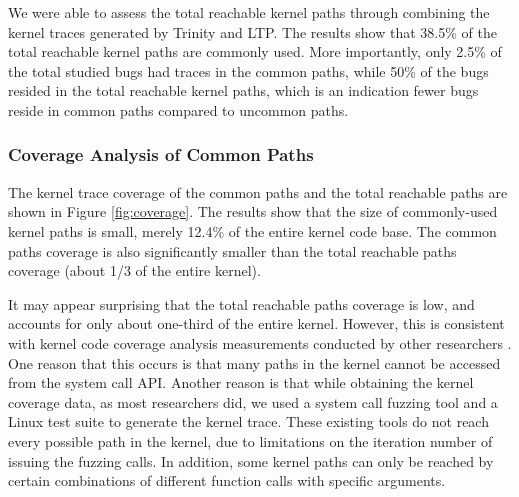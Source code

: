 We were able to assess the total reachable kernel paths through combining the kernel traces generated by Trinity and LTP.
The results show that 38.5\% of the total reachable
kernel paths are commonly used. More importantly, only 2.5\% of the total studied bugs had traces in the common paths,
while 50\% of the bugs resided in the total reachable kernel paths, which is an
indication fewer bugs reside in common paths compared to uncommon paths.


\subsubsection{Coverage Analysis of Common Paths}

The kernel trace coverage of the common paths and the total reachable paths
are shown in Figure \ref{fig:coverage}. The results show that the size of commonly-used kernel paths is small,
merely 12.4\% of the entire kernel code base. The common paths coverage is also significantly smaller than
the total reachable paths coverage (about 1/3 of the entire kernel).

It may appear surprising that the total reachable paths coverage is low,
and accounts for only about one-third of the entire kernel. However,
this is consistent with kernel code coverage analysis
measurements conducted by other researchers \cite{LTP-Coverage}.
One reason that this occurs is that many paths
in the kernel cannot be accessed from the system call API. Another reason
is that
while obtaining the kernel coverage data, as most researchers did, we used
a system call fuzzing tool
and a Linux test suite to generate the kernel trace. These existing
tools do not reach every possible path in the kernel, due to
limitations on the iteration number of issuing
the fuzzing calls. In addition, some kernel paths can only be reached by
certain combinations of different function calls with specific arguments.


